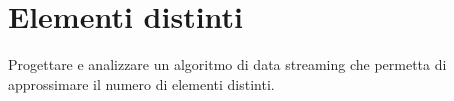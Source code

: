 \chapter{Elementi distinti}

\begin{problem*}
    Progettare e analizzare un algoritmo di data streaming che permetta di
    approssimare il numero di elementi distinti.
\end{problem*}

